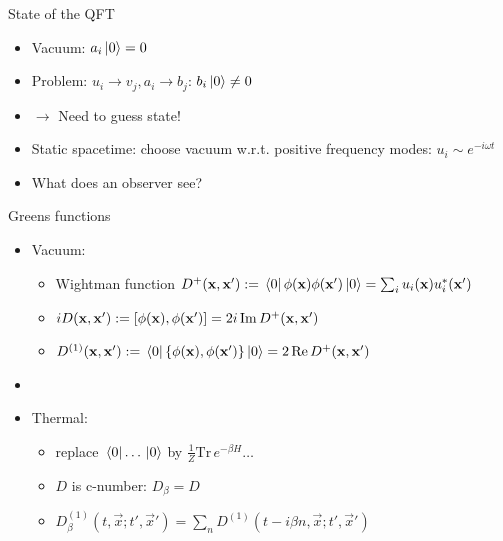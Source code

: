 \documentclass{beamer}
\renewcommand{\va}[1]{\vec{#1}}
\begin{document}
\begin{frame}{State of the QFT}
\begin{itemize}
	\item Vacuum: \(a_i \ket*{0} = 0\)
	\item Problem: \(u_i \to v_j, a_i \to b_j\): \(b_i \ket*{0} \neq 0\)
	\item[] \(\to\) Need to guess state!
	\item Static spacetime: choose vacuum w.r.t. positive frequency modes: \(u_i \sim e^{-i\omega t}\)
	\item What does an observer see? 
\end{itemize}
\end{frame}

\begin{frame}{Greens functions\cite{davies}}
\begin{itemize}
	\item Vacuum:
	\begin{itemize}
		\item Wightman function \(D^+(\vb{x},\vb{x}') := \bra*{0}\phi(\vb{x})\phi(\vb{x}')\ket*{0} = \sum_i u_i(\vb{x}) u_i^*(\vb{x}')\)
 		\item \(i D(\vb{x},\vb{x}') := [\phi(\vb{x}),\phi(\vb{x}')] = 2i\,\mathrm{Im}\,D^+(\vb{x},\vb{x}')\)
		\item \(D^{(1)}(\vb{x},\vb{x}') := \bra*{0}\{\phi(\vb{x}),\phi(\vb{x}')\}\ket*{0}= 2\,\mathrm{Re}\,D^+(\vb{x},\vb{x}')\)
	\end{itemize}
	\item[]
	\item Thermal:
	\begin{itemize}
		\item replace \(\bra*{0}\dots\ket*{0}\) by \(\frac{1}{Z} \mathrm{Tr}\,e^{-\beta H} \dots\)
		\item \(D\) is c-number: \(D_\beta = D\)
		\item \(D^{(1)}_\beta(t,\va{x};t',\va{x}') = \sum_n D^{(1)}(t-i\beta n, \va{x};t',\va{x}')\)
	\end{itemize}
\end{itemize}
\end{frame}
\end{document}
